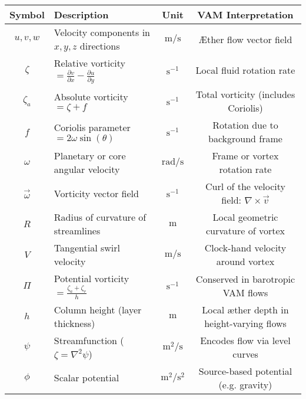 \documentclass[12pt]{article}
\begin{document}
    \begin{table}[H]
        \centering
        \footnotesize
        \renewcommand{\arraystretch}{1.4}
        \begin{tabular}{|c|l|c|c|}
            \hline
            \textbf{Symbol} & \textbf{Description} & \textbf{Unit} & \textbf{VAM Interpretation} \\
            \hline
            $u, v, w$      & Velocity components in $x, y, z$ directions & $\mathrm{m/s}$ & Æther flow vector field \\
            \hline
            $\zeta$        & Relative vorticity $= \frac{\partial v}{\partial x} - \frac{\partial u}{\partial y}$ & $\mathrm{s}^{-1}$ & Local fluid rotation rate \\
            \hline
            $\zeta_a$      & Absolute vorticity $= \zeta + f$ & $\mathrm{s}^{-1}$ & Total vorticity (includes Coriolis) \\
            \hline
            $f$            & Coriolis parameter $= 2\omega \sin(\theta)$ & $\mathrm{s}^{-1}$ & Rotation due to background frame \\
            \hline
            $\omega$       & Planetary or core angular velocity & $\mathrm{rad/s}$ & Frame or vortex rotation rate \\
            \hline
            $\vec{\omega}$ & Vorticity vector field & $\mathrm{s}^{-1}$ & Curl of the velocity field: $\nabla \times \vec{v}$ \\
            \hline
            $R$            & Radius of curvature of streamlines & $\mathrm{m}$ & Local geometric curvature of vortex \\
            \hline
            $V$            & Tangential swirl velocity & $\mathrm{m/s}$ & Clock-hand velocity around vortex \\
            \hline
            $\Pi$          & Potential vorticity $= \frac{\zeta_a + \zeta_r}{h}$ & $\mathrm{s}^{-1}$ & Conserved in barotropic VAM flows \\
            \hline
            $h$            & Column height (layer thickness) & $\mathrm{m}$ & Local æther depth in height-varying flows \\
            \hline
            $\psi$         & Streamfunction ($\zeta = \nabla^2 \psi$) & $\mathrm{m^2/s}$ & Encodes flow via level curves \\
            \hline
            $\phi$         & Scalar potential & $\mathrm{m^2/s^2}$ & Source-based potential (e.g. gravity) \\
            \hline

\end{tabular}
\end{table}
\end{document}
